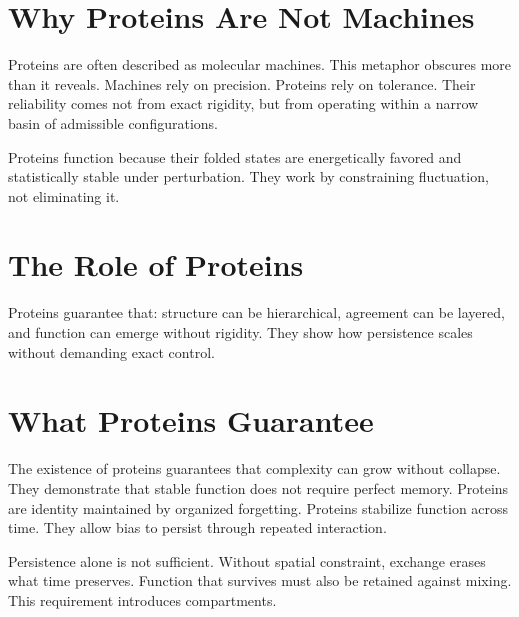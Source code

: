 \documentclass[11pt,twoside,openright]{book}
\begin{document}
\section*{Why Proteins Are Not Machines}

Proteins are often described as molecular machines. This metaphor obscures more than it reveals. Machines rely on precision. Proteins rely on tolerance. Their reliability comes not from exact rigidity, but from operating within a narrow basin of admissible configurations.

Proteins function because their folded states are energetically favored and statistically stable under perturbation. They work by constraining fluctuation, not eliminating it.

\section*{The Role of Proteins}

Proteins guarantee that: structure can be hierarchical, agreement can be layered, and function can emerge without rigidity. They show how persistence scales without demanding exact control.

\section*{What Proteins Guarantee}

The existence of proteins guarantees that complexity can grow without collapse. They demonstrate that stable function does not require perfect memory. Proteins are identity maintained by organized forgetting. Proteins stabilize function across time. They allow bias to persist through repeated interaction.

Persistence alone is not sufficient. Without spatial constraint, exchange erases what time preserves. Function that survives must also be retained against mixing. This requirement introduces compartments.
\end{document}
